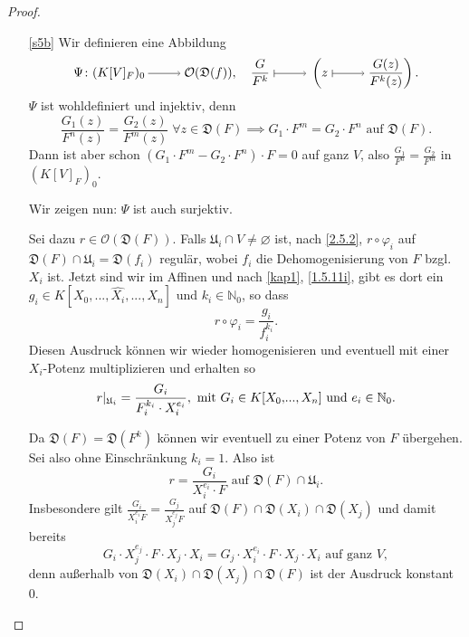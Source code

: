 \documentclass[a4paper,12pt,index=toc]{scrbook}
\theoremstyle{keinenummern} %
\def\O{\mathcal{O}}
\newcommand{\D}{\mathfrak{D}}
\def\U{\mathfrak{U}}
\newcommand{\leer}{\ensuremath{\varnothing}}
\newcommand{\restrict}[1]{|_{#1}}
\renewcommand{\dotsc}{\ensuremath{\!...}}
\newcommand{\set}[1]{\ensuremath{\mathbb{#1}}}
\newcommand{\N}{\set{N}}
\newcommand{\dach}{\widehat}
\newcommand{\ppolyx}[1][n]{\ensuremath%
  [X_{0},\dotsc,X_{#1}]}
\begin{document}
\begin{proof}\begin{enumerate}
\item[\ref{s5b}] Wir definieren eine Abbildung
\begin{equation*}\Psi\colon(K[V]_{F})_{0}\ra\O(\D(f)),\quad\frac{G}{F^{k}}\mapsto\left(z\mapsto\frac{G(z)}{F^{k}(z)}\right).\end{equation*}
$\Psi$ ist wohldefiniert und injektiv, denn
\begin{equation*}\frac{G_{1}(z)}{F^{n}(z)}=\frac{G_{2}(z)}{F^{m}(z)}\;\forall z\in\D(F)\implies G_{1}\cdot F^{m}=G_{2}\cdot F^{n}\text{ auf }\D(F).\end{equation*}
Dann ist aber schon $(G_{1}\cdot F^{m}-G_{2}\cdot F^{n})\cdot F=0$ auf ganz $V$, also $\frac{G_{1}}{F^{n}}=\frac{G_{2}}{F^{m}}$ in $(K[V]_{F})_{0}$.

Wir zeigen nun: $\Psi$ ist auch surjektiv.

Sei dazu $r\in\O(\D(F))$. Falls $\U_{i}\cap V\neq\leer$ ist, nach \cref{2.5.2}, $r\circ\varphi_{i}$ auf $\D(F)\cap \U_{i}=\D(f_{i})$ regulär, wobei $f_{i}$ die Dehomogenisierung von $F$ bzgl. $X_{i}$ ist. Jetzt sind wir im Affinen und nach \cref{kap1}, \cref{1.5.11i}, gibt es dort ein $g_{i}\in K[X_{0},\dotsc,\dach{X_{i}},\dotsc,X_{n}]$ und $k_{i}\in\N_{0}$, so dass
\begin{equation*}r\circ\varphi_{i}=\frac{g_{i}}{f_{i}^{k_{i}}}.\end{equation*}
Diesen Ausdruck können wir wieder homogenisieren und eventuell mit einer $X_{i}$-Potenz multiplizieren und erhalten so
\begin{equation*}r\restrict{\U_{i}}=\frac{G_{i}}{F_{i}^{k_{i}}\cdot X_{i}^{e_{i}}},\text{ mit }G_{i}\in K\ppolyx\text{ und }e_{i}\in\N_{0}.\end{equation*}

Da $\D(F)=\D(F^{k})$ können wir eventuell zu einer Potenz von $F$ übergehen. Sei also ohne Einschränkung $k_{i}=1$. Also ist
\begin{equation*}r=\frac{G_{i}}{X_{i}^{e_{i}}\cdot F}\text{ auf }\D(F)\cap \U_{i}.\end{equation*}
Insbesondere gilt $\frac{G_{i}}{X_{i}^{e_{i}}F}=\frac{G_{j}}{X_{j}^{e_{j}}F}$ auf $\D(F)\cap\D(X_{i})\cap\D(X_{j})$ und damit bereits
\begin{equation}\label{s5s}G_{i}\cdot X_{j}^{e_{j}}\cdot F\cdot X_{j}\cdot X_{i}=G_{j}\cdot X_{i}^{e_{i}}\cdot F\cdot X_{j}\cdot X_{i}\text{ auf ganz }V,\tag{$*$}\end{equation}
denn außerhalb von $\D(X_{i})\cap\D(X_{j})\cap\D(F)$ ist der Ausdruck konstant $0$.


\end{enumerate}
\end{proof}
\end{document}
